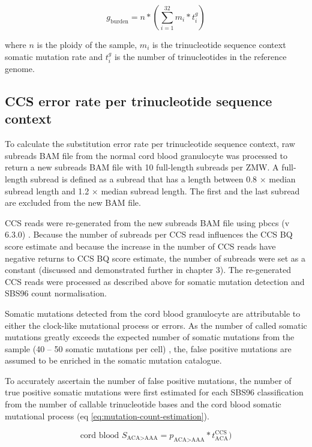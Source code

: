 \begin{equation} \label{eq:mutation-burden-per-cell}
g_{\text{burden}} = n * (\sum^{32}_{i=1} m_{i} * t^{g}_{i})
\end{equation}

where $n$ is the ploidy of the sample, $m_{i}$ is the trinucleotide sequence context somatic mutation rate and $t^{g}_{i}$ is the number of trinucleotides in the reference genome.

\subsection{CCS error rate per trinucleotide sequence context}

To calculate the substitution error rate per trinucleotide sequence context, raw subreads BAM file from the normal cord blood granulocyte was processed to return a new subreads BAM file with 10 full-length subreads per ZMW. A full-length subread is defined as a subread that has a length between 0.8 $\times$ median subread length and 1.2 $\times$ median subread length. The first and the last subread are excluded from the new BAM file. 

CCS reads were re-generated from the new subreads BAM file using pbccs (v 6.3.0) \cite{}. Because the number of subreads per CCS read influences the CCS BQ score estimate and because the increase in the number of CCS reads have negative returns to CCS BQ score estimate, the number of subreads were set as a constant (discussed and demonstrated further in chapter 3). The re-generated CCS reads were processed as described above for somatic mutation detection and SBS96 count normalisation. 

Somatic mutations detected from the cord blood granulocyte are attributable to either the clock-like mutational process or errors. As the number of called somatic mutations greatly exceeds the expected number of somatic mutations from the sample (40 – 50 somatic mutations per cell) \cite{Osorio2018-mh, Mitchell2022-ry}, the, false positive mutations are assumed to be enriched in the somatic mutation catalogue. 
 
To accurately ascertain the number of false positive mutations, the number of true positive somatic mutations were first estimated for each SBS96 classification from the number of callable trinucleotide bases and the cord blood somatic mutational process (eq \ref{eq:mutation-count-estimation}). 

\begin{equation} \label{eq:mutation-count-estimation}
\text{cord blood } S_{\text{ACA>AAA}}= p_{\text{ACA>AAA}} * t^{\text{CCS}}_{\text{ACA}})
\end{equation}

